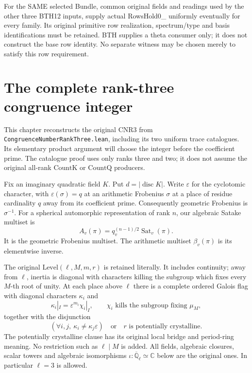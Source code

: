\documentclass[11pt,a4paper]{article}
\numberwithin{equation}{section}
\theoremstyle{remark}\newtheorem{remark}[theorem]{Remark}
\begin{document}
For the SAME selected Bundle, common original fields and readings used by the other three BTH12 inputs, supply actual RowsHold0\_ uniformly eventually for every family. Its original primitive row realization, spectrum/type and basis identifications must be retained. BTH supplies a theta consumer only; it does not construct the base row identity. No separate witness may be chosen merely to satisfy this row requirement.



\clearpage
\section{The complete rank-three congruence integer}
\label{sec:rank-three-congruence-v46}

This chapter reconstructs the original $\mathrm{CNR3}$ from
\texttt{Congruence\allowbreak Number\allowbreak Rank\allowbreak Three.\allowbreak lean}, including its two uniform
trace catalogues.  Its elementary product argument will choose the
integer before the coefficient prime.  The catalogue proof uses only
ranks three and two; it does not assume the original all-rank
$\mathrm{CountK}$ or $\mathrm{CountQ}$ producers.

Fix an imaginary quadratic field $K$.  Put $d=|\operatorname{disc}K|$.
Write $\varepsilon$ for the cyclotomic character, with
$\varepsilon(\sigma)=q$ at an arithmetic Frobenius $\sigma$ at a
place of residue cardinality $q$ away from its coefficient prime.
Consequently geometric Frobenius is $\sigma^{-1}$.
For a spherical automorphic representation of rank $n$, our
algebraic Satake multiset is
\[
 A_v(\pi)=q_v^{(n-1)/2}\operatorname{Sat}_v(\pi).
                                                               \tag{RNC.1}
\]
It is the geometric Frobenius multiset.  The arithmetic multiset
$\beta_v(\pi)$ is its elementwise inverse.

The original $\mathrm{Level}(\ell,M,m,r)$ is retained literally.
It includes continuity; away from $\ell$, inertia is diagonal with
characters killing the subgroup which fixes every $M$-th root of
unity.  At each place above $\ell$ there is a complete ordered
Galois flag with diagonal characters $\kappa_i$ and
\[
 \kappa_i|_I=\varepsilon^{m_i}\chi_i|_I,
 \qquad \chi_i\text{ kills the subgroup fixing }\mu_M,
                                                               \tag{RNC.2}
\]
together with the disjunction
\[
 (\forall i,j,\ \kappa_i\ne\kappa_j\varepsilon)
       \quad\text{or}\quad r\text{ is potentially crystalline}.
                                                               \tag{RNC.3}
\]
The potentially crystalline clause has its original local bridge
and period-ring meaning.  No restriction such as $\ell\mid M$ is
added.  All fields, algebraic closures, scalar towers and algebraic
isomorphisms $\iota:\overline{\mathbb Q}_\ell\simeq\mathbb C$
below are the original ones.  In particular $\ell=3$ is allowed.
\end{document}
